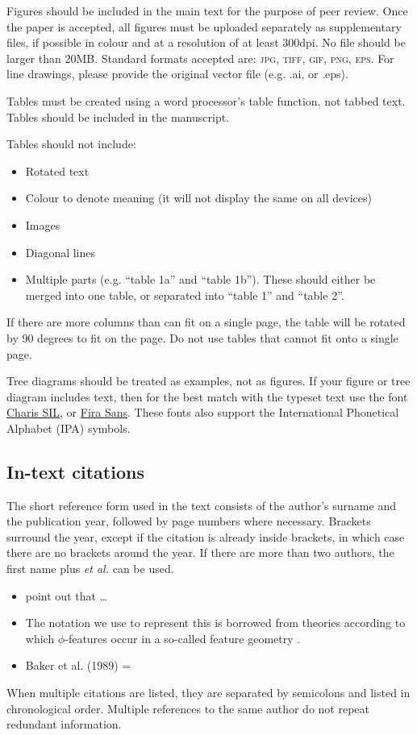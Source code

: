 \documentclass[charis,linguex]{glossa}
\begin{document}
Figures should be included in the main text for the purpose of peer review. Once the paper is accepted, all figures must be uploaded separately as supplementary files, if possible in colour and at a resolution of at least 300dpi. No file should be larger than 20MB. Standard formats accepted are: \textsc{jpg, tiff, gif, png, eps}. For line drawings, please provide the original vector file (e.g. .ai, or .eps).

Tables must be created using a word processor's table function, not tabbed text. Tables should be included in the manuscript. 

Tables should not include:

\begin{itemize}
\item Rotated text
\item Colour to denote meaning (it will not display the same on all devices)
\item Images
\item Diagonal lines
\item Multiple parts (e.g. ``table 1a'' and ``table 1b''). These should either be merged into one table, or separated into ``table 1'' and ``table 2''.
\end{itemize}
If there are more columns than can fit on a single page, the table will be rotated by 90 degrees to fit on the page. Do not use tables that cannot fit onto a single page.

Tree diagrams should be treated as examples, not as figures. If your figure or tree diagram includes text, then for the best match with the typeset text use the font \href{https://software.sil.org/charis/download/}{Charis SIL}, or \href{https://www.fontsquirrel.com/fonts/fira-sans}{Fira Sans}. These fonts also support the International Phonetical Alphabet (IPA) symbols.


\subsection{In-text citations}

The short reference form used in the text consists of the author’s surname and the publication year, followed by page numbers where necessary. Brackets surround the year, except if the citation is already inside brackets, in which case there are no brackets around the year. If there are more than two authors, the first name plus \textit{et al.} can be used.

\begin{itemize}
\item \citet[514]{murray:1983} point out that \ldots
\item The notation we use to represent this is borrowed from theories according to which $\phi$-features occur in a so-called feature geometry \citep[248-250]{mccarthy:1999}.
\item Baker et al. (1989) = \citet*{baker:1989}
\end{itemize}
When multiple citations are listed, they are separated by semicolons and listed in chronological order. Multiple references to the same author do not repeat redundant information.
\end{document}
